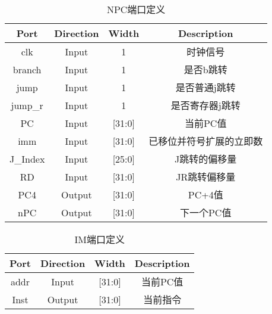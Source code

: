\documentclass[UTF8]{ctexart}
\begin{document}
\begin{table}[H]
	\centering
	\begin{threeparttable}
		\caption{NPC端口定义}
		\begin{tabular}{cccc}
			\toprule
			\rowcolor{mypink}
			\textbf{Port} & \textbf{Direction} & \textbf{Width} & \textbf{Description}     \\
			\midrule
			clk           & Input              & 1              & 时钟信号                 \\
			\midrule
			branch        & Input              & 1              & 是否b跳转                \\
			\midrule
			jump          & Input              & 1              & 是否普通j跳转            \\
			\midrule
			jump\_r       & Input              & 1              & 是否寄存器j跳转          \\
			\midrule
			PC            & Input              & [31:0]         & 当前PC值                 \\
			\midrule
			imm           & Input              & [31:0]         & 已移位并符号扩展的立即数 \\
			\midrule
			J\_Index      & Input              & [25:0]         & J跳转的偏移量            \\
			\midrule
			RD            & Input              & [31:0]         & JR跳转偏移量             \\
			\midrule
			PC4           & Output             & [31:0]         & PC+4值                   \\
			\midrule
			nPC           & Output             & [31:0]         & 下一个PC值               \\
			\midrule
		\end{tabular}
	\end{threeparttable}
\end{table}
\begin{table}[H]
	\centering
	\begin{threeparttable}
		\caption{IM端口定义}
		\begin{tabular}{cccc}
			\toprule
			\rowcolor{mypink}
			\textbf{Port} & \textbf{Direction} & \textbf{Width} & \textbf{Description} \\
			\midrule
			addr          & Input              & [31:0]         & 当前PC值             \\
			\midrule
			Inst          & Output             & [31:0]         & 当前指令             \\
			\midrule
		\end{tabular}
	\end{threeparttable}
\end{table}
\newpage
\end{document}
